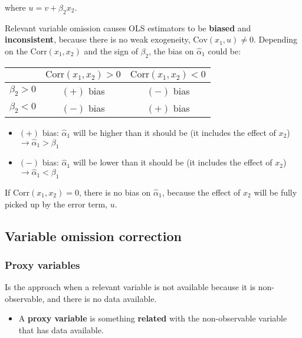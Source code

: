 \documentclass[10pt, a4paper, landscape]{extarticle}
\newcommand{\Cov}{\mathrm{Cov}}
\newcommand{\Corr}{\mathrm{Corr}}
\begin{document}
\begin{multicols}{3}
\quad where $u = v + \beta_2 x_2$.

Relevant variable omission causes OLS estimators to be \textbf{biased} and \textbf{inconsistent}, because there is no weak exogeneity, $\Cov(x_1, u) \neq 0$. Depending on the $\Corr(x_1, x_2)$ and the sign of $\beta_2$, the bias on $\hat{\alpha}_1$ could be:

\begin{center}
	\begin{tabular}{ c | c c }
		              & $\Corr(x_1, x_2) > 0$ & $\Corr(x_1, x_2) < 0$ \\ \hline
		$\beta_2 > 0$ & $(+)$ bias            & $(-)$ bias            \\
		$\beta_2 < 0$ & $(-)$ bias            & $(+)$ bias
	\end{tabular}
\end{center}

\begin{itemize}[leftmargin=*]
	\item $(+)$ bias: $\hat{\alpha}_1$ will be higher than it should be (it includes the effect of $x_2$) $\rightarrow \hat{\alpha}_1 > \beta_1$
	\item $(-)$ bias: $\hat{\alpha}_1$ will be lower than it should be (it includes the effect of $x_2$) $\rightarrow \hat{\alpha}_1 < \beta_1$
\end{itemize}

If $\Corr(x_1, x_2) = 0$, there is no bias on $\hat{\alpha}_1$, because the effect of $x_2$ will be fully picked up by the error term, $u$.

\columnbreak

\subsection*{Variable omission correction}

\subsubsection*{Proxy variables}

Is the approach when a relevant variable is not available because it is non-observable, and there is no data available.

\begin{itemize}[leftmargin=*]
	\item A \textbf{proxy variable} is something \textbf{related} with the non-observable variable that has data available.
\end{itemize}


\end{multicols}
\end{document}
